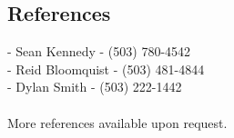 \documentclass[margin]{res}
\begin{document}
\begin{resume}







\section{References}
- Sean Kennedy - (503) 780-4542\\
- Reid Bloomquist - (503) 481-4844\\
- Dylan Smith - (503) 222-1442\\
 \\
More references available upon request.
\end{resume}
\end{document}
